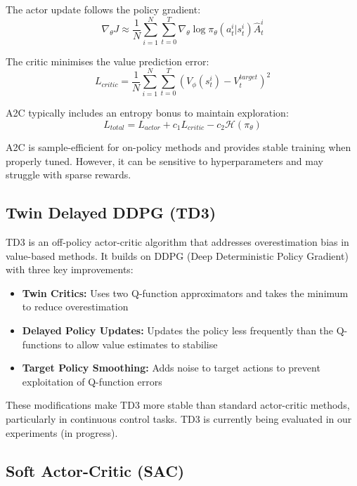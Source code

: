 \documentclass[12pt,a4paper]{report}
\begin{document}
The actor update follows the policy gradient:
\begin{equation}
\nabla_\theta J \approx \frac{1}{N} \sum_{i=1}^{N} \sum_{t=0}^{T} \nabla_\theta \log \pi_\theta(a_t^i|s_t^i) \hat{A}_t^i
\end{equation}

The critic minimises the value prediction error:
\begin{equation}
L_{critic} = \frac{1}{N} \sum_{i=1}^{N} \sum_{t=0}^{T} \left( V_\phi(s_t^i) - V^{target}_t \right)^2
\end{equation}

A2C typically includes an entropy bonus to maintain exploration:
\begin{equation}
L_{total} = L_{actor} + c_1 L_{critic} - c_2 \mathcal{H}(\pi_\theta)
\end{equation}

A2C is sample-efficient for on-policy methods and provides stable training when properly tuned. However, it can be sensitive to hyperparameters and may struggle with sparse rewards.

\subsection{Twin Delayed DDPG (TD3)}

TD3 \cite{fujimoto2018addressing} is an off-policy actor-critic algorithm that addresses overestimation bias in value-based methods. It builds on DDPG (Deep Deterministic Policy Gradient) \cite{lillicrap2015continuous} with three key improvements:

\begin{itemize}
    \item \textbf{Twin Critics:} Uses two Q-function approximators and takes the minimum to reduce overestimation
    \item \textbf{Delayed Policy Updates:} Updates the policy less frequently than the Q-functions to allow value estimates to stabilise
    \item \textbf{Target Policy Smoothing:} Adds noise to target actions to prevent exploitation of Q-function errors
\end{itemize}

These modifications make TD3 more stable than standard actor-critic methods, particularly in continuous control tasks. TD3 is currently being evaluated in our experiments (in progress).

\subsection{Soft Actor-Critic (SAC)}
\end{document}
